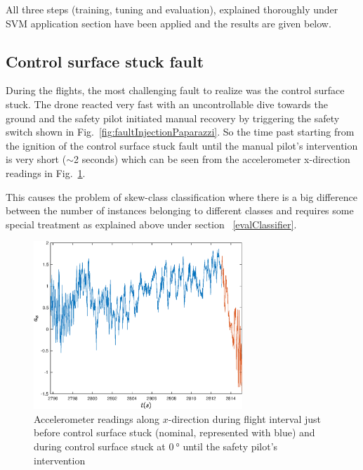 All three steps (training, tuning and evaluation), explained thoroughly under SVM application section have been applied and the results are given below.

\subsection{Control surface stuck fault}

During the flights, the most challenging fault to realize was the control surface stuck. 
The drone reacted very fast with an uncontrollable dive towards the ground and the safety pilot initiated manual recovery by triggering the safety switch shown in Fig.~\ref{fig:faultInjectionPaparazzi}. 
So the time past starting from the ignition of the control surface stuck fault until the manual pilot's intervention is very short ($\sim$2 seconds) which can be seen from the accelerometer x-direction readings in Fig.~\ref{fig:acc_x}. 

This causes the problem of skew-class classification where there is a big difference between the number of instances belonging to different classes and requires some special treatment as explained above under section ~\ref{evalClassifier}.

\begin{figure}[H]
\begin{center}
\includegraphics[width=0.7\textwidth]{figures/acc_x}    %
\caption{Accelerometer readings along $x$-direction during flight interval just before control surface stuck (nominal, represented with blue) and during control surface stuck at $\SI{0}{\degree}$ until the safety pilot's intervention} 
\label{fig:acc_x}
\end{center}
\end{figure}

